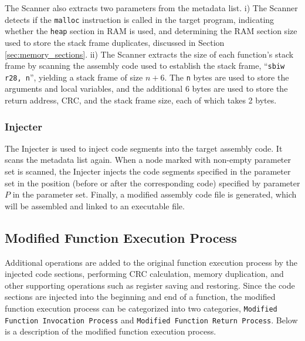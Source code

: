 The Scanner also extracts two parameters from the metadata list. i) The Scanner detects if the \texttt{malloc} instruction is called in the target program, indicating whether the \texttt{heap} section in RAM is used, and determining the RAM section size used to store the stack frame duplicates, discussed in Section \ref{sec:memory_sections}. ii) The Scanner extracts the size of each function's stack frame by scanning the assembly code used to establish the stack frame, ``\texttt{sbiw r28, n}'', yielding a stack frame of size $n + 6$. The \texttt{n} bytes are used to store the arguments and local variables, and the additional $6$ bytes are used to store the return address, CRC, and the stack frame size, each of which takes 2 bytes.

\subsubsection{Injecter}

The Injecter is used to inject code segments into the target assembly code. It scans the metadata list again. When a node marked with non-empty parameter set is scanned, the Injecter injects the code segments specified in the parameter set in the position (before or after the corresponding code) specified by parameter $P$ in the parameter set. Finally, a modified assembly code file is generated, which will be assembled and linked to an executable file.


\subsection{Modified Function Execution Process}

Additional operations are added to the original function execution process by the injected code sections, performing CRC calculation, memory duplication, and other supporting operations such as register saving and restoring. Since the code sections are injected into the beginning and end of a function, the modified function execution process can be categorized into two categories, \texttt{Modified Function Invocation Process} and \texttt{Modified Function Return Process}. Below is a description of the modified function execution process.

